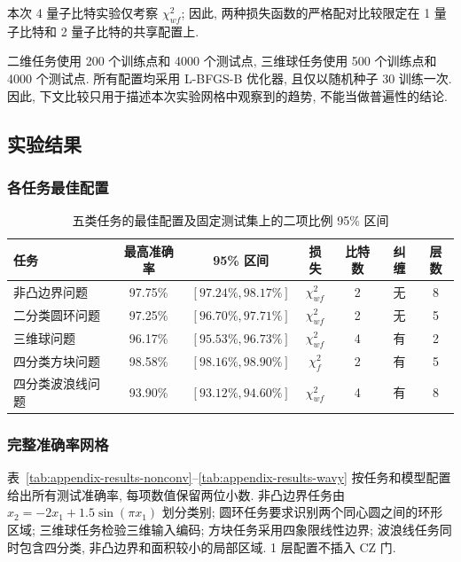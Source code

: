 \documentclass[a4paper]{ctexart}
\begin{document}
本次 4 量子比特实验仅考察 $\chi_{wf}^2$; 因此, 两种损失函数的严格配对比较限定在 1 量子比特和 2 量子比特的共享配置上.

二维任务使用 200 个训练点和 4000 个测试点, 三维球任务使用 500 个训练点和 4000 个测试点. 所有配置均采用 L-BFGS-B 优化器, 且仅以随机种子 30 训练一次. 因此, 下文比较只用于描述本次实验网格中观察到的趋势, 不能当做普遍性的结论.

\subsection{实验结果}

\subsubsection{各任务最佳配置}

\begin{table}[H]
    \centering
    \caption{五类任务的最佳配置及固定测试集上的二项比例 95\% 区间}
    \label{tab:appendix-best-summary}
    \renewcommand{\arraystretch}{1.3}
    \begin{tabular*}{\textwidth}{@{\extracolsep{\fill}}lcccccc@{}}
        \toprule
        任务 & 最高准确率 & 95\% 区间 & 损失 & 比特数 & 纠缠 & 层数 \\
        \midrule
        非凸边界问题 & 97.75\% & $[97.24\%, 98.17\%]$ & $\chi_{wf}^2$ & 2 & 无 & 8 \\
        二分类圆环问题 & 97.25\% & $[96.70\%, 97.71\%]$ & $\chi_{wf}^2$ & 2 & 无 & 5 \\
        三维球问题 & 96.17\% & $[95.53\%, 96.73\%]$ & $\chi_{wf}^2$ & 4 & 有 & 2 \\
        四分类方块问题 & 98.58\% & $[98.16\%, 98.90\%]$ & $\chi_f^2$ & 2 & 有 & 5 \\
        四分类波浪线问题 & 93.90\% & $[93.12\%, 94.60\%]$ & $\chi_{wf}^2$ & 4 & 有 & 8 \\
        \bottomrule
    \end{tabular*}
\end{table}

\subsubsection{完整准确率网格}
表~\ref{tab:appendix-results-nonconv}--\ref{tab:appendix-results-wavy} 按任务和模型配置给出所有测试准确率, 每项数值保留两位小数. 非凸边界任务由 $x_2=-2x_1+1.5\sin(\pi x_1)$ 划分类别; 圆环任务要求识别两个同心圆之间的环形区域; 三维球任务检验三维输入编码; 方块任务采用四象限线性边界; 波浪线任务同时包含四分类, 非凸边界和面积较小的局部区域. 1 层配置不插入 CZ 门.
\end{document}
